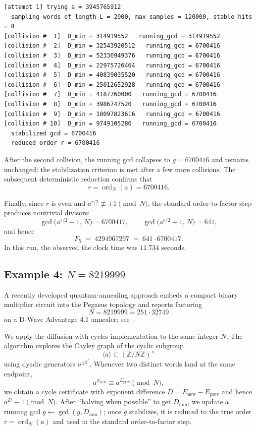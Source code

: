 \documentclass[11pt,reqno]{article}
\numberwithin{equation}{section}
\DeclareMathOperator{\ord}{ord}
\theoremstyle{plain}
\theoremstyle{definition}
\theoremstyle{remark}
\begin{document}
\begin{verbatim}
[attempt 1] trying a = 3945765912
  sampling words of length L = 2000, max_samples = 120000, stable_hits = 8
[collision #  1]  D_min = 314919552   running_gcd = 314919552
[collision #  2]  D_min = 32543920512   running_gcd = 6700416
[collision #  3]  D_min = 52336949376   running_gcd = 6700416
[collision #  4]  D_min = 22975726464   running_gcd = 6700416
[collision #  5]  D_min = 40839035520   running_gcd = 6700416
[collision #  6]  D_min = 25012652928   running_gcd = 6700416
[collision #  7]  D_min = 4187760000   running_gcd = 6700416
[collision #  8]  D_min = 3986747520   running_gcd = 6700416
[collision #  9]  D_min = 18097823616   running_gcd = 6700416
[collision # 10]  D_min = 9749105280   running_gcd = 6700416
  stabilized gcd = 6700416
  reduced order r = 6700416
\end{verbatim}

After the second collision, the running gcd collapses to $g=6700416$ and remains unchanged; the
stabilization criterion is met after a few more collisions. The subsequent deterministic reduction
confirms that
\[
r=\ord_N(a)=6700416.
\]

Finally, since $r$ is even and $a^{r/2}\not\equiv \pm 1\pmod N$, the standard order-to-factor step
produces nontrivial divisors:
\[
\gcd\!\bigl(a^{r/2}-1,\,N\bigr)=6700417,
\qquad
\gcd\!\bigl(a^{r/2}+1,\,N\bigr)=641,
\]
and hence
\[
F_5 \;=\; 4294967297 \;=\; 641\cdot 6700417.
\]
In this run, the observed the clock time was $11.734$ seconds.

\subsection{Example 4: $N=8219999$}

A recently developed quantum-annealing approach embeds a compact binary
multiplier circuit into the Pegasus topology and reports factoring
\[
N=8219999 = 251\cdot 32749
\]
on a D-Wave Advantage 4.1 annealer; see~\cite{DSS24}.

We apply the diffusion-with-cycles implementation to the same integer $N$.
The algorithm explores the Cayley graph of the cyclic subgroup
\[
\langle a\rangle \subset (\mathbb Z/N\mathbb Z)^{\times}
\]
using dyadic generators $a^{\pm 2^t}$.
Whenever two distinct words land at the same endpoint,
\[
a^{E_{\mathrm{new}}}\equiv a^{E_{\mathrm{prev}}}\pmod N,
\]
we obtain a cycle certificate with exponent difference
$D=E_{\mathrm{new}}-E_{\mathrm{prev}}$ and hence $a^D\equiv 1\pmod N$.
After ``halving when possible'' to get $D_{\min}$, we update a running gcd
$g\leftarrow \gcd(g,D_{\min})$; once $g$ stabilizes, it is reduced to the true order
$r=\ord_N(a)$ and used in the standard order-to-factor step.
\end{document}
